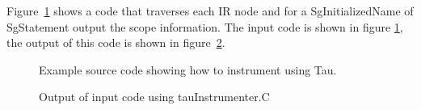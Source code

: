     Figure~\ref{Tutorial:example_tauInstrumenter}
shows a code that traverses each IR node and for a 
SgInitializedName of SgStatement output the scope information.
The input code is shown in figure \ref{Tutorial:example_tauInstrumenter},
the output of this code is shown in 
figure~\ref{Tutorial:exampleOutput_tauInstrumenter}.


\begin{figure}[!h]
{\indent
{\mySmallFontSize


\begin{latexonly}
   
\end{latexonly}

\begin{htmlonly}
   
\end{htmlonly}

}
}
\caption{Example source code showing how to instrument using Tau. }
\label{Tutorial:example_tauInstrumenter}
\end{figure}




\begin{figure}[!h]
{\indent
{\mySmallFontSize


\begin{latexonly}
   
\end{latexonly}

\begin{htmlonly}
   
\end{htmlonly}

}
}
\caption{Output of input code using tauInstrumenter.C}
\label{Tutorial:exampleOutput_tauInstrumenter}
\end{figure}

